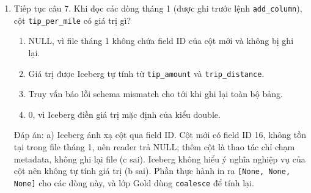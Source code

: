 \documentclass[12pt]{article}
\begin{document}
\begin{enumerate}[label=\textbf{\arabic*.}, leftmargin=1.6em, itemsep=1.2em]
\begin{aivncodebox}[Code]
\begin{python}
tbl = catalog.create_table("silver.trips", schema=schema)
tbl.append(jan)
with tbl.update_schema() as u:
    u.add_column("tip_per_mile", DoubleType())
with tbl.update_spec() as s:
    s.add_field("pickup_at", DayTransform(), "pickup_day")
tbl.append(feb)
tbl.delete(delete_filter=GreaterThan("fare_amount", 500.0))
\end{python}
\end{aivncodebox}
\begin{enumerate}[label=\alph*), leftmargin=2.2em, itemsep=1pt]
    \item 3
    \item 4
    \item 5
    \item 6
\end{enumerate}
\begin{guidelinebox}{Đáp án: a)}
Snapshot chỉ được tạo khi tập data file của bảng thay đổi. \texttt{create\_table} tạo bảng rỗng, chưa có snapshot. \texttt{update\_schema} và \texttt{update\_spec} chỉ tạo \texttt{metadata.json} mới. Hai lệnh \texttt{append} và lệnh \texttt{delete} tạo ba snapshot với operation lần lượt là \texttt{append}, \texttt{append}, \texttt{overwrite}, đúng như output của \texttt{02\_silver\_lakehouse.py}. Số file \texttt{metadata.json} thì nhiều hơn số snapshot.
\end{guidelinebox}

\item Tiếp tục câu 7. Khi đọc các dòng tháng 1 (được ghi trước lệnh \texttt{add\_column}), cột \texttt{tip\_per\_mile} có giá trị gì?

\begin{enumerate}[label=\alph*), leftmargin=2.2em, itemsep=1pt]
    \item NULL, vì file tháng 1 không chứa field ID của cột mới và không bị ghi lại.
    \item Giá trị được Iceberg tự tính từ \texttt{tip\_amount} và \texttt{trip\_distance}.
    \item Truy vấn báo lỗi schema mismatch cho tới khi ghi lại toàn bộ bảng.
    \item 0, vì Iceberg điền giá trị mặc định của kiểu double.
\end{enumerate}
\begin{guidelinebox}{Đáp án: a)}
Iceberg ánh xạ cột qua field ID. Cột mới có field ID 16, không tồn tại trong file tháng 1, nên reader trả NULL; thêm cột là thao tác chỉ chạm metadata, không ghi lại file (c sai). Iceberg không hiểu ý nghĩa nghiệp vụ của cột nên không tự tính giá trị (b sai). Phần thực hành in ra \texttt{[None, None, None]} cho các dòng này, và lớp Gold dùng \texttt{coalesce} để tính lại.
\end{guidelinebox}


\end{enumerate}
\end{document}
